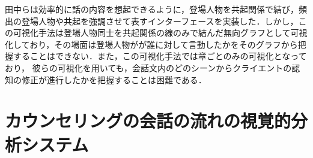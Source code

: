 \documentclass[shuuron]{kuee}
\begin{document}
田中ら\cite{tanaka}は効率的に話の内容を想起できるように，登場人物を共起関係で結び，頻出の登場人物や共起を強調させて表すインターフェースを実装した．しかし，この可視化手法は登場人物同士を共起関係の線のみで結んだ無向グラフとして可視化しており，その場面は登場人物がが誰に対して言動したかをそのグラフから把握することはできない．また，この可視化手法では章ごとのみの可視化となっており， 彼らの可視化を用いても，会話文内のどのシーンからクライエントの認知の修正が進行したかを把握することは困難である．





























\chapter{カウンセリングの会話の流れの視覚的分析システム} %
\end{document}
